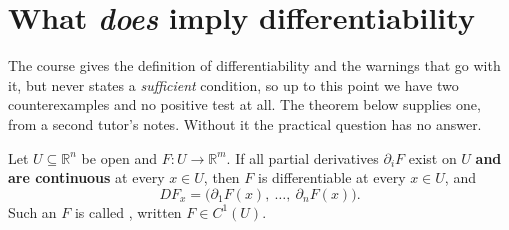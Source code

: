 
\section{What \emph{does} imply differentiability}
\label{sec:sufficient_condition_differentiability}

\begin{ainote}
The course gives the definition of differentiability and the warnings that go with it, but never
states a \emph{sufficient} condition, so up to this point we have two counterexamples and no
positive test at all. The theorem below supplies one, from a second tutor's notes. Without it the
practical question  has no answer.
\end{ainote}

\begin{theorem}
\label{thm:continuous_partials_imply_differentiable}
Let $U \subseteq \mathbb{R}^n$ be open and $F : U \to \mathbb{R}^m$. If all partial derivatives
$\partial_iF$ exist on $U$ \textbf{and are continuous} at every $x \in U$, then $F$ is
differentiable at every $x \in U$, and
\[DF_x = \big(\partial_1F(x),\ \dots,\ \partial_nF(x)\big).\]
Such an $F$ is called , written $F \in C^1(U)$.
\end{theorem}

